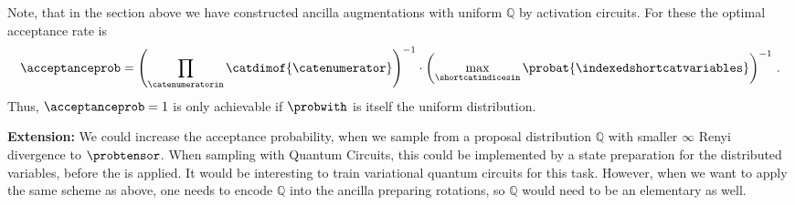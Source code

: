 %

Note, that in the section above we have constructed ancilla augmentations with uniform $\mathbb{Q}$ by activation circuits.
For these the optimal acceptance rate is
\begin{align*}
    \acceptanceprob
    = \left(\prod_{\catenumeratorin}\catdimof{\catenumerator}\right)^{-1}
    \cdot \left(\max_{\shortcatindicesin} \probat{\indexedshortcatvariables}\right)^{-1} \, .
\end{align*}
Thus, $\acceptanceprob=1$ is only achievable if $\probwith$ is itself the uniform distribution.

\textbf{Extension:}
We could increase the acceptance probability, when we sample from a proposal distribution $\mathbb{Q}$ with smaller $\infty$ Renyi divergence to $\probtensor$.
When sampling with Quantum Circuits, this could be implemented by a state preparation for the distributed variables, before the \ComputationActivationCircuit{} is applied.
It would be interesting to train variational quantum circuits for this task.
However, when we want to apply the same scheme as above, one needs to encode $\mathbb{Q}$ into the ancilla preparing rotations, so $\mathbb{Q}$ would need to be an elementary \ComputationActivationNetwork{} as well.

